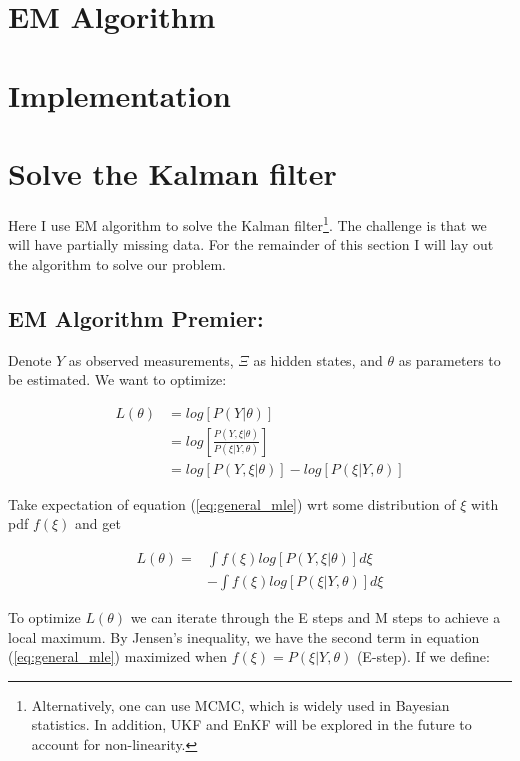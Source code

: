 \documentclass[12pt]{article}
\numberwithin{equation}{section}
\begin{document}
\section{EM Algorithm}

\section{Implementation}

\section{Solve the Kalman filter} \label{sec:kf}

Here I use EM algorithm to solve the Kalman filter\footnote{Alternatively, one can use MCMC, which is widely used in Bayesian statistics. In addition, UKF and EnKF will be explored in the future to account for non-linearity.}. The challenge is that we will have partially missing data. For the remainder of this section I will lay out the algorithm to solve our problem.

\subsection{EM Algorithm Premier:} \label{subsec:premier}
Denote $Y$ as observed measurements, $\Xi$ as hidden states, and $\theta$ as parameters to be estimated. We want to optimize:

\begin{align}
    L(\theta) & = log[P(Y|\theta)] \nonumber \\
    & = log\left[\frac{P(Y,\xi|\theta)}{P(\xi|Y,\theta)}\right] \nonumber \\
    & = log[P(Y,\xi|\theta)] - log[P(\xi|Y,\theta)] \label{eq:general_mle}
\end{align}

Take expectation of equation (\ref{eq:general_mle}) wrt some distribution of $\xi$ with pdf $f(\xi)$ and get

\begin{align}
    L(\theta) = & \int f(\xi)log[P(Y,\xi|\theta)]d\xi \nonumber \\
    & - \int f(\xi)log[P(\xi|Y,\theta)]d\xi \nonumber
\end{align}

To optimize $L(\theta)$ we can iterate through the E steps and M steps to achieve a local maximum. By Jensen's inequality, we have the second term in equation (\ref{eq:general_mle}) maximized when $f(\xi)=P(\xi|Y,\theta)$ (E-step). If we define:
\end{document}

